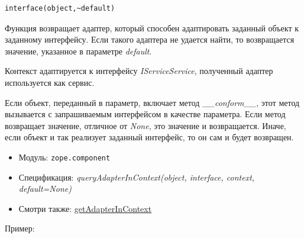 \documentclass[a4paper,openany,twoside,final]{book}
\providecommand*{\DUroletitlereference}[1]{\textsl{#1}}
\begin{document}
\begin{verbatim}
interface(object,~default)
\end{verbatim}

Функция возвращает адаптер, который способен адаптировать заданный объект к заданному интерфейсу.  Если такого адаптера не удается найти, то возвращается значение, указанное в параметре \DUroletitlereference{default}.

Контекст адаптируется к интерфейсу \DUroletitlereference{IServiceService}, полученный адаптер используется как сервис.

Если объект, переданный в параметр, включает метод \DUroletitlereference{\_\_conform\_\_}, этот метод вызывается с запрашиваемым интерфейсом в качестве параметра.  Если метод возвращает значение, отличное от \DUroletitlereference{None}, это значение и возвращается.  Иначе, если объект и так реализует заданный интерфейс, то он сам и будет возвращен.

\begin{itemize}

\item Модуль: \texttt{zope.component}

\item Спецификация: \DUroletitlereference{queryAdapterInContext(object, interface, context, default=None)}

\item Смотри также: \hyperref[getadapterincontext]{getAdapterInContext}

\end{itemize}

Пример:
\end{document}
